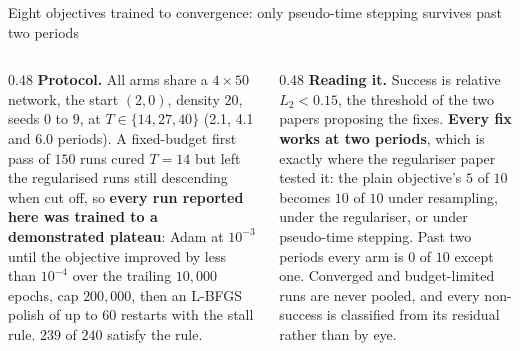 \documentclass[aspectratio=169,10pt]{beamer}
\newcommand{\hl}[1]{{\color{accent}\textbf{#1}}}
\begin{document}
\begin{frame}[shrink=25]{Eight objectives trained to convergence: only pseudo-time stepping survives past two periods}
  \begin{columns}[T]
    \begin{column}{0.48\textwidth}
      {\footnotesize \textbf{Protocol.} All arms share a $4\times50$ network,
       the start $(2,0)$, density $20$, seeds $0$ to $9$, at
       $T \in \{14, 27, 40\}$ (2.1, 4.1 and 6.0 periods). A fixed-budget first
       pass of $150$ runs cured $T = 14$ but left the regularised runs still
       descending when cut off, so \hl{every run reported here was trained to a
       demonstrated plateau}: Adam at $10^{-3}$ until the objective improved by
       less than $10^{-4}$ over the trailing $10{,}000$ epochs, cap $200{,}000$,
       then an L-BFGS polish of up to $60$ restarts with the stall rule.
       $239$ of $240$ satisfy the rule.}
    \end{column}
    \begin{column}{0.48\textwidth}
      {\footnotesize \textbf{Reading it.} Success is relative $L_2 < 0.15$, the
       threshold of the two papers proposing the fixes. \hl{Every fix works at
       two periods}, which is exactly where the regulariser paper tested it: the
       plain objective's $5$ of $10$ becomes $10$ of $10$ under resampling,
       under the regulariser, or under pseudo-time stepping. Past two periods
       every arm is $0$ of $10$ except one. Converged and budget-limited runs
       are never pooled, and every non-success is classified from its residual
       rather than by eye.}
    \end{column}
  \end{columns}
\end{frame}
\end{document}
